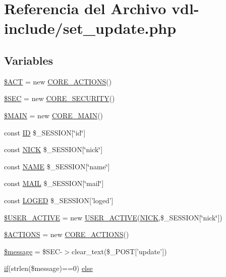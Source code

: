 \hypertarget{set__update_8php}{\section{Referencia del Archivo vdl-\/include/set\-\_\-update.php}
\label{set__update_8php}
}
\subsection*{Variables}
\begin{DoxyCompactItemize}
\item 
\hyperlink{set__update_8php_acccd6054a25e75994d89dd0d42dab8fc}{\$\-A\-C\-T} = new \hyperlink{classCORE__ACTIONS}{C\-O\-R\-E\-\_\-\-A\-C\-T\-I\-O\-N\-S}()
\item 
\hyperlink{set__update_8php_a68aa4f40df62985576ba2fc584690b9f}{\$\-S\-E\-C} = new \hyperlink{classCORE__SECURITY}{C\-O\-R\-E\-\_\-\-S\-E\-C\-U\-R\-I\-T\-Y}()
\item 
\hyperlink{set__update_8php_aa3efd4a61925b50d9d066bd2b42dcd3d}{\$\-M\-A\-I\-N} = new \hyperlink{classCORE__MAIN}{C\-O\-R\-E\-\_\-\-M\-A\-I\-N}()
\item 
const \hyperlink{set__update_8php_a0242c89b204631bde9edc65a9a731f47}{I\-D} \$\-\_\-\-S\-E\-S\-S\-I\-O\-N\mbox{[}\char`\"{}id\char`\"{}\mbox{]}
\item 
const \hyperlink{set__update_8php_abdd850ab3ab0275cf56392a54ffb3af9}{N\-I\-C\-K} \$\-\_\-\-S\-E\-S\-S\-I\-O\-N\mbox{[}\char`\"{}nick\char`\"{}\mbox{]}
\item 
const \hyperlink{set__update_8php_a244352f035b82b20b0efa506167fd862}{N\-A\-M\-E} \$\-\_\-\-S\-E\-S\-S\-I\-O\-N\mbox{[}\char`\"{}name\char`\"{}\mbox{]}
\item 
const \hyperlink{set__update_8php_a347ad8be6c67745f0c0fac9638a0eec2}{M\-A\-I\-L} \$\-\_\-\-S\-E\-S\-S\-I\-O\-N\mbox{[}\char`\"{}mail\char`\"{}\mbox{]}
\item 
const \hyperlink{set__update_8php_a2c67e1e38c1ba2b45b1fb652313c6d22}{L\-O\-G\-E\-D} \$\-\_\-\-S\-E\-S\-S\-I\-O\-N\mbox{[}'loged'\mbox{]}
\item 
\hyperlink{set__update_8php_ab0978072b4a0a336b6ca785fa4553c59}{\$\-U\-S\-E\-R\-\_\-\-A\-C\-T\-I\-V\-E} = new \hyperlink{classUSER__ACTIVE}{U\-S\-E\-R\-\_\-\-A\-C\-T\-I\-V\-E}(\hyperlink{set__update_8php_abdd850ab3ab0275cf56392a54ffb3af9}{N\-I\-C\-K},\$\-\_\-\-S\-E\-S\-S\-I\-O\-N\mbox{[}\char`\"{}nick\char`\"{}\mbox{]})
\item 
\hyperlink{set__update_8php_afd09e7ecb266b5fb5bf6e9c716b64a40}{\$\-A\-C\-T\-I\-O\-N\-S} = new \hyperlink{classCORE__ACTIONS}{C\-O\-R\-E\-\_\-\-A\-C\-T\-I\-O\-N\-S}()
\item 
\hyperlink{set__update_8php_abf17cb2dba2ed17cb28aa5f37deb5293}{\$message} = \$S\-E\-C-\/$>$clear\-\_\-text(\$\-\_\-\-P\-O\-S\-T\mbox{[}'update'\mbox{]})
\item 
\hyperlink{index_8php_a03ed0eadab502a2cb754ef4963570e97}{if}(strlen(\$message)==0) \hyperlink{set__update_8php_a2357f3864a6cb2b6bc8da68f6aca92eb}{else}
\end{DoxyCompactItemize}


